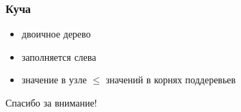 \documentclass[17pt]{beamer}
\begin{document}
\begin{frame}
    \frametitle{Куча}
    \begin{itemize}
        \item двоичное дерево
        \item заполняется слева
        \item значение в узле $ \leq $ значений в корнях поддеревьев
    \end{itemize}
\end{frame}
\fontsize{14pt}{14pt}\selectfont


\begin{frame}
    \begin{center}
        \Large Спасибо за внимание!
    \end{center}
\end{frame}
\end{document}
